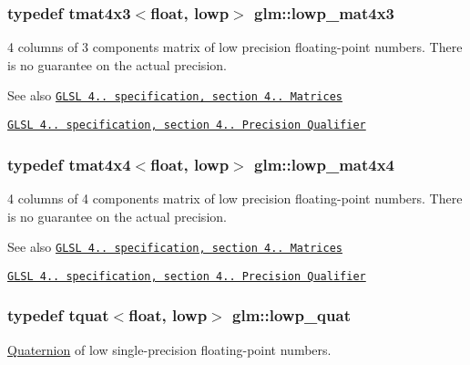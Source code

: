 \subsubsection[{lowp\+\_\+mat4x3}]{\setlength{\rightskip}{0pt plus 5cm}typedef tmat4x3$<$float, lowp$>$ {\bf glm\+::lowp\+\_\+mat4x3}}\label{namespaceglm_ac228d98de7baadab88ca5d9c72e8cc95}
4 columns of 3 components matrix of low precision floating-\/point numbers. There is no guarantee on the actual precision.

\begin{DoxySeeAlso}{See also}
\href{http://www.opengl.org/registry/doc/GLSLangSpec.4.20.8.pdf}{\tt G\+L\+S\+L 4.. specification, section 4.. Matrices} 

\href{http://www.opengl.org/registry/doc/GLSLangSpec.4.20.8.pdf}{\tt G\+L\+S\+L 4.. specification, section 4.. Precision Qualifier} 
\end{DoxySeeAlso}
\hypertarget{namespaceglm_a8045c48adb60a799b49b05d48e3b182e}{}
\subsubsection[{lowp\+\_\+mat4x4}]{\setlength{\rightskip}{0pt plus 5cm}typedef tmat4x4$<$float, lowp$>$ {\bf glm\+::lowp\+\_\+mat4x4}}\label{namespaceglm_a8045c48adb60a799b49b05d48e3b182e}
4 columns of 4 components matrix of low precision floating-\/point numbers. There is no guarantee on the actual precision.

\begin{DoxySeeAlso}{See also}
\href{http://www.opengl.org/registry/doc/GLSLangSpec.4.20.8.pdf}{\tt G\+L\+S\+L 4.. specification, section 4.. Matrices} 

\href{http://www.opengl.org/registry/doc/GLSLangSpec.4.20.8.pdf}{\tt G\+L\+S\+L 4.. specification, section 4.. Precision Qualifier} 
\end{DoxySeeAlso}
\hypertarget{namespaceglm_a8437cbf48dab98eb12880f5aa7c1e038}{}
\subsubsection[{lowp\+\_\+quat}]{\setlength{\rightskip}{0pt plus 5cm}typedef {\bf tquat}$<$float, lowp$>$ {\bf glm\+::lowp\+\_\+quat}}\label{namespaceglm_a8437cbf48dab98eb12880f5aa7c1e038}
\hyperlink{class_quaternion}{Quaternion} of low single-\/precision floating-\/point numbers.

